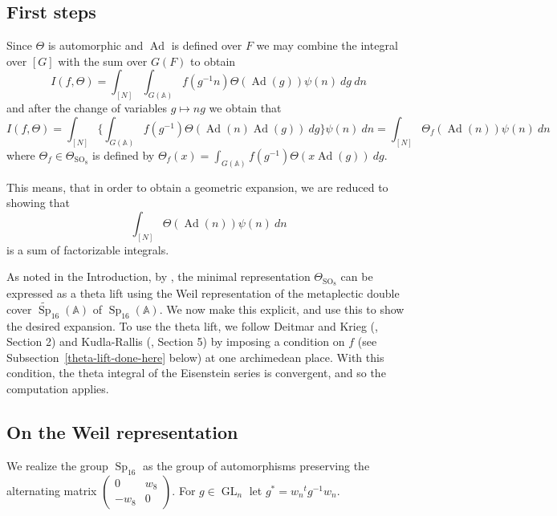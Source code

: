 \documentclass[12pt]{amsart}
\newcommand{\GL}{\operatorname{GL}}
\newcommand{\Sp}{\operatorname{Sp}}
\newcommand{\SO}{\operatorname{SO}}
\newcommand{\Ad}{\operatorname{Ad}}
\newcommand{\A}{\mathbb{A}}
\newcommand{\sm}[4]{\left(\begin{smallmatrix}{#1}&{#2}\\{#3}&{#4}\end{smallmatrix}\right)}
\theoremstyle{remark}
\begin{document}
\subsection{First steps}
Since $\Theta$ is automorphic and $\Ad$ is defined over $F$ we may combine the integral over $[G]$ with the sum over $G(F)$ to obtain
\[
I(f,\Theta)=\int_{[N]}\int_{G(\A)} f(g^{-1}n) \Theta(\Ad(g)) \psi(n)\ dg\ dn
\]
and after the change of variables $g\mapsto ng$ we obtain that 
\begin{equation}\label{eq crude form I}
I(f,\Theta)=\int_{[N]} \{\int_{G(\A)} f(g^{-1})\Theta(\Ad(n)\Ad(g))\ dg\}\psi(n)\ dn=\int_{[N]} \Theta_f(\Ad(n))\psi(n)\ dn
\end{equation}
where $\Theta_f\in \Theta_{\SO_8}$ is defined by $\Theta_f(x)=\int_{G(\A)} f(g^{-1}) \Theta(x\Ad(g))\ dg$.

This means, that in order to obtain a geometric expansion, we are reduced to showing that
\[
\int_{[N]}\Theta(\Ad(n))\psi(n)\ dn
\] 
is a sum of factorizable integrals.

As noted in the Introduction, by \cite[Theorem 6.9]{MR1469105}, the minimal representation $\Theta_{\SO_8}$ can be expressed as a theta lift using the Weil representation of the 
metaplectic double cover $\widetilde{\Sp}_{16}(\A)$ of $\Sp_{16}(\A)$.  We now make this explicit, and use this to show the desired expansion.
To use the theta lift, we follow Deitmar and Krieg (\cite{MR1128710}, Section 2) and Kudla-Rallis (\cite{MR1289491}, Section 5) by imposing a condition on $f$ (see Subsection~\ref{theta-lift-done-here} below) at one archimedean place.
With this condition, the theta integral of the Eisenstein series is convergent, and so the computation applies. 
 



\subsection{On the Weil representation}
We realize the group $\Sp_{16}$ as the group of automorphisms preserving the alternating matrix $\sm{0}{w_8}{-w_8}{0}$. For $g\in \GL_n$ let $g^*=w_n {}^t g^{-1} w_n$.
\end{document}
